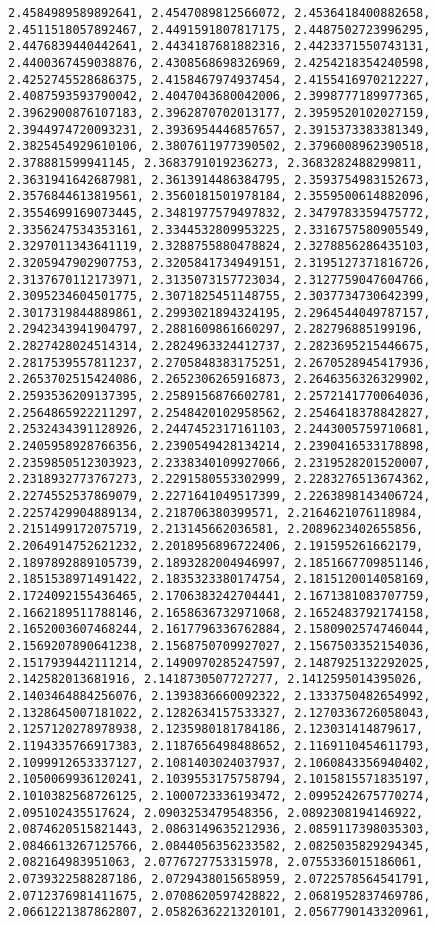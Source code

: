 \documentclass[11pt]{article}
\begin{document}
\begin{Verbatim}[commandchars=\\\{\}]
2.4584989589892641, 2.4547089812566072, 2.4536418400882658, 2.4511518057892467, 2.4491591807817175, 2.4487502723996295, 2.4476839440442641, 2.4434187681882316, 2.4423371550743131, 2.4400367459038876, 2.4308568698326969, 2.4254218354240598, 2.4252745528686375, 2.4158467974937454, 2.4155416970212227, 2.4087593593790042, 2.4047043680042006, 2.3998777189977365, 2.3962900876107183, 2.3962870702013177, 2.3959520102027159, 2.3944974720093231, 2.3936954446857657, 2.3915373383381349, 2.3825454929610106, 2.3807611977390502, 2.3796008962390518, 2.378881599941145, 2.3683791019236273, 2.3683282488299811, 2.3631941642687981, 2.3613914486384795, 2.3593754983152673, 2.3576844613819561, 2.3560181501978184, 2.3559500614882096, 2.3554699169073445, 2.3481977579497832, 2.3479783359475772, 2.3356247534353161, 2.3344532809953225, 2.3316757580905549, 2.3297011343641119, 2.3288755880478824, 2.3278856286435103, 2.3205947902907753, 2.3205841734949151, 2.3195127371816726, 2.3137670112173971, 2.3135073157723034, 2.3127759047604766, 2.3095234604501775, 2.3071825451148755, 2.3037734730642399, 2.3017319844889861, 2.2993021894324195, 2.2964544049787157, 2.2942343941904797, 2.2881609861660297, 2.282796885199196, 2.2827428024514314, 2.2824963324412737, 2.2823695215446675, 2.2817539557811237, 2.2705848383175251, 2.2670528945417936, 2.2653702515424086, 2.2652306265916873, 2.2646356326329902, 2.2593536209137395, 2.2589156876602781, 2.2572141770064036, 2.2564865922211297, 2.2548420102958562, 2.2546418378842827, 2.2532434391128926, 2.2447452317161103, 2.2443005759710681, 2.2405958928766356, 2.2390549428134214, 2.2390416533178898, 2.2359850512303923, 2.2338340109927066, 2.2319528201520007, 2.2318932773767273, 2.2291580553302999, 2.2283276513674362, 2.2274552537869079, 2.2271641049517399, 2.2263898143406724, 2.2257429904889134, 2.218706380399571, 2.2164621076118984, 2.2151499172075719, 2.213145662036581, 2.2089623402655856, 2.2064914752621232, 2.2018956896722406, 2.191595261662179, 2.1897892889105739, 2.1893282004946997, 2.1851667709851146, 2.1851538971491422, 2.1835323380174754, 2.1815120014058169, 2.1724092155436465, 2.1706383242704441, 2.1671381083707759, 2.1662189511788146, 2.1658636732971068, 2.1652483792174158, 2.1652003607468244, 2.1617796336762884, 2.1580902574746044, 2.1569207890641238, 2.1568750709927027, 2.1567503352154036, 2.1517939442111214, 2.1490970285247597, 2.1487925132292025, 2.142582013681916, 2.1418730507727277, 2.1412595014395026, 2.1403464884256076, 2.1393836660092322, 2.1333750482654992, 2.1328645007181022, 2.1282634157533327, 2.1270336726058043, 2.1257120278978938, 2.1235980181784186, 2.123031414879617, 2.1194335766917383, 2.1187656498488652, 2.1169110454611793, 2.1099912653337127, 2.1081403024037937, 2.1060843356940402, 2.1050069936120241, 2.1039553175758794, 2.1015815571835197, 2.1010382568726125, 2.1000723336193472, 2.0995242675770274, 2.095102435517624, 2.0903253479548356, 2.0892308194146922, 2.0874620515821443, 2.0863149635212936, 2.0859117398035303, 2.0846613267125766, 2.0844056356233582, 2.0825035829294345, 2.082164983951063, 2.0776727753315978, 2.0755336015186061, 2.0739322588287186, 2.0729438015658959, 2.0722578564541791, 2.0712376981411675, 2.0708620597428822, 2.0681952837469786, 2.0661221387862807, 2.0582636221320101, 2.0567790143320961, 
\end{Verbatim}
\end{document}
